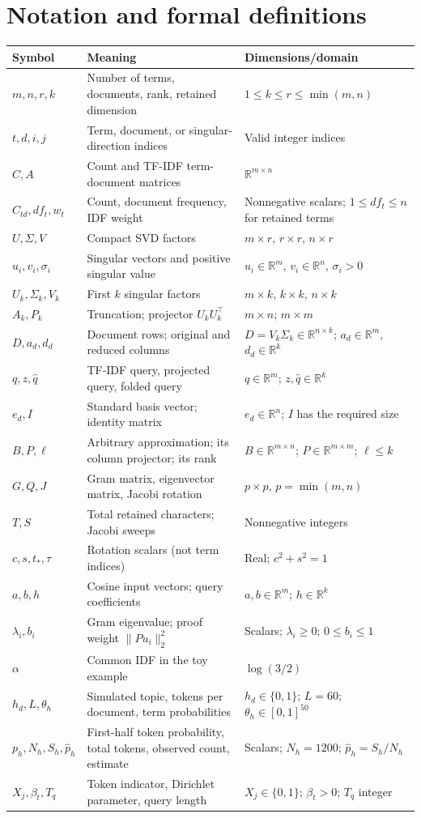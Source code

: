 \documentclass[11pt]{article}
\newcommand{\R}{\mathbb{R}}
\begin{document}
\section{Notation and formal definitions}
\begin{longtable}{p{}p{}p{}}
\toprule Symbol & Meaning & Dimensions/domain \\ \midrule\endhead
$m,n,r,k$ & Number of terms, documents, rank, retained dimension & $1\le k\le r\le\min(m,n)$ \\
$t,d,i,j$ & Term, document, or singular-direction indices & Valid integer indices \\
$C,A$ & Count and TF-IDF term-document matrices & $\R^{m\times n}$ \\
$C_{td},df_t,w_t$ & Count, document frequency, IDF weight & Nonnegative scalars; $1\le df_t\le n$ for retained terms \\
$U,\Sigma,V$ & Compact SVD factors & $m\times r$, $r\times r$, $n\times r$ \\
$u_i,v_i,\sigma_i$ & Singular vectors and positive singular value & $u_i\in\R^m$, $v_i\in\R^n$, $\sigma_i>0$ \\
$U_k,\Sigma_k,V_k$ & First $k$ singular factors & $m\times k$, $k\times k$, $n\times k$ \\
$A_k,P_k$ & Truncation; projector $U_kU_k^\top$ & $m\times n$; $m\times m$ \\
$D,a_d,d_d$ & Document rows; original and reduced columns & $D=V_k\Sigma_k\in\R^{n\times k}$; $a_d\in\R^m$, $d_d\in\R^k$ \\
$q,z,\widehat q$ & TF-IDF query, projected query, folded query & $q\in\R^m$; $z,\widehat q\in\R^k$ \\
$e_d,I$ & Standard basis vector; identity matrix & $e_d\in\R^n$; $I$ has the required size \\
$B,P,\ell$ & Arbitrary approximation; its column projector; its rank & $B\in\R^{m\times n}$; $P\in\R^{m\times m}$; $\ell\le k$ \\
$G,Q,J$ & Gram matrix, eigenvector matrix, Jacobi rotation & $p\times p$, $p=\min(m,n)$ \\
$T,S$ & Total retained characters; Jacobi sweeps & Nonnegative integers \\
$c,s,t_*,\tau$ & Rotation scalars (not term indices) & Real; $c^2+s^2=1$ \\
$a,b,h$ & Cosine input vectors; query coefficients & $a,b\in\R^m$; $h\in\R^k$ \\
$\lambda_i,b_i$ & Gram eigenvalue; proof weight $\|Pu_i\|_2^2$ & Scalars; $\lambda_i\ge0$; $0\le b_i\le1$ \\
$\alpha$ & Common IDF in the toy example & $\log(3/2)$ \\
$h_d,L,\theta_h$ & Simulated topic, tokens per document, term probabilities & $h_d\in\{0,1\}$; $L=60$; $\theta_h\in[0,1]^{50}$ \\
$p_h,N_h,S_h,\widehat p_h$ & First-half token probability, total tokens, observed count, estimate & Scalars; $N_h=1200$; $\widehat p_h=S_h/N_h$ \\
$X_j,\beta_t,T_q$ & Token indicator, Dirichlet parameter, query length & $X_j\in\{0,1\}$; $\beta_t>0$; $T_q$ integer \\
\bottomrule
\end{longtable}
\end{document}

